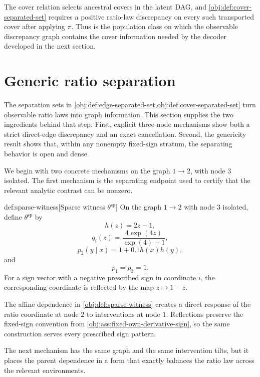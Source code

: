 \documentclass[11pt]{article}
\begin{document}
The cover relation  selects ancestral covers in the latent DAG, and \cref{obj:def:cover-separated-set} requires a positive ratio-law discrepancy on every such transported cover after applying \(\pi\). Thus  is the population class on which the observable discrepancy graph contains the cover information needed by the decoder developed in the next section.


\section{Generic ratio separation}\label{sec:generic-separation}

The separation sets in \cref{obj:def:edge-separated-set,obj:def:cover-separated-set} turn observable ratio laws into graph information. This section supplies the two ingredients behind that step. First, explicit three-node mechanisms show both a strict direct-edge discrepancy and an exact cancellation. Second, the genericity result shows that, within any nonempty fixed-sign stratum, the separating behavior is open and dense.

We begin with two concrete mechanisms on the graph \(1\to2\), with node \(3\) isolated. The first mechanism is the separating endpoint used to certify that the relevant analytic contrast can be nonzero.

\begin{definitionv}{def:sparse-witness}[Sparse witness \(\theta^{\mathrm{sp}}\)]
On the graph \(1\to2\) with node \(3\) isolated, define \(\theta^{\mathrm{sp}}\) by
\[
h(z)=2z-1,
\]
\[
q_i(z)=\frac{4\exp(4z)}{\exp(4)-1},
\]
\[
p_2(y\mid x)=1+0.1h(x)h(y),
\]
and
\[
p_1=p_3=1.
\]
For a sign vector with a negative prescribed sign in coordinate \(i\), the corresponding coordinate is reflected by the map \(z\mapsto1-z\).
\end{definitionv}

The affine dependence in \cref{obj:def:sparse-witness} creates a direct response of the ratio coordinate at node \(2\) to interventions at node \(1\). Reflections preserve the fixed-sign convention from \cref{obj:ass:fixed-own-derivative-sign}, so the same construction serves every prescribed sign pattern.

The next mechanism has the same graph and the same intervention tilts, but it places the parent dependence in a form that exactly balances the ratio law across the relevant environments.
\end{document}
